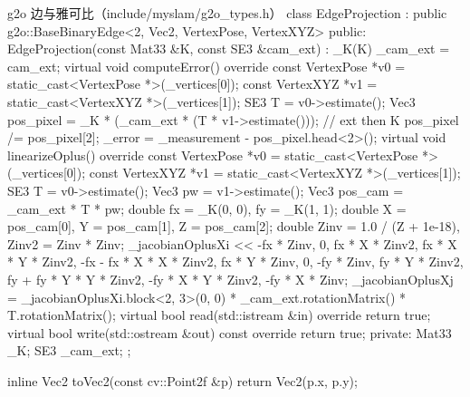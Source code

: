 \begin{codebox}[C++]{g2o 边与雅可比（include/myslam/g2o\_types.h）}
class EdgeProjection : public g2o::BaseBinaryEdge<2, Vec2, VertexPose, VertexXYZ> {
   public:
    EdgeProjection(const Mat33 &K, const SE3 &cam_ext) : _K(K) { _cam_ext = cam_ext; }
    virtual void computeError() override {
        const VertexPose *v0 = static_cast<VertexPose *>(_vertices[0]);
        const VertexXYZ  *v1 = static_cast<VertexXYZ  *>(_vertices[1]);
        SE3 T = v0->estimate();
        Vec3 pos_pixel = _K * (_cam_ext * (T * v1->estimate()));   // ext then K
        pos_pixel /= pos_pixel[2];
        _error = _measurement - pos_pixel.head<2>();
    }
    virtual void linearizeOplus() override {
        const VertexPose *v0 = static_cast<VertexPose *>(_vertices[0]);
        const VertexXYZ  *v1 = static_cast<VertexXYZ  *>(_vertices[1]);
        SE3 T = v0->estimate(); Vec3 pw = v1->estimate();
        Vec3 pos_cam = _cam_ext * T * pw;
        double fx = _K(0, 0), fy = _K(1, 1);
        double X = pos_cam[0], Y = pos_cam[1], Z = pos_cam[2];
        double Zinv = 1.0 / (Z + 1e-18), Zinv2 = Zinv * Zinv;
        _jacobianOplusXi << -fx * Zinv, 0, fx * X * Zinv2, fx * X * Y * Zinv2,
            -fx - fx * X * X * Zinv2, fx * Y * Zinv, 0, -fy * Zinv,
            fy * Y * Zinv2, fy + fy * Y * Y * Zinv2, -fy * X * Y * Zinv2, -fy * X * Zinv;
        _jacobianOplusXj = _jacobianOplusXi.block<2, 3>(0, 0) *
                           _cam_ext.rotationMatrix() * T.rotationMatrix();
    }
    virtual bool read(std::istream &in) override  { return true; }
    virtual bool write(std::ostream &out) const override { return true; }
   private:
    Mat33 _K; SE3 _cam_ext;
};

inline Vec2 toVec2(const cv::Point2f &p) { return Vec2(p.x, p.y); }
\end{codebox}

